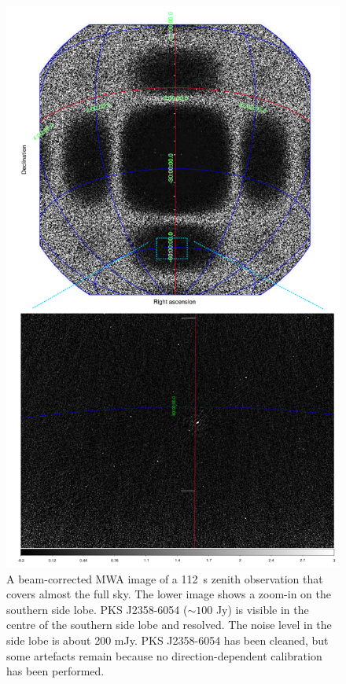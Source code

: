 \documentclass[useAMS,usenatbib]{mn2e}
\begin{document}
\begin{figure}
\begin{center}
\includegraphics[width=13.5cm]{img/fullsky-together}
\caption{A beam-corrected MWA image of a 112~s zenith observation that covers almost the full sky. The lower image shows a zoom-in on the southern side lobe. PKS J2358-6054 ($\sim100$ Jy) is visible in the centre of the southern side lobe and resolved. The noise level in the side lobe is about 200 mJy. PKS J2358-6054 has been cleaned, but some artefacts remain because no direction-dependent calibration has been performed.}
\label{fig:full-sky-example}
\end{center}
\end{figure}
\end{document}
